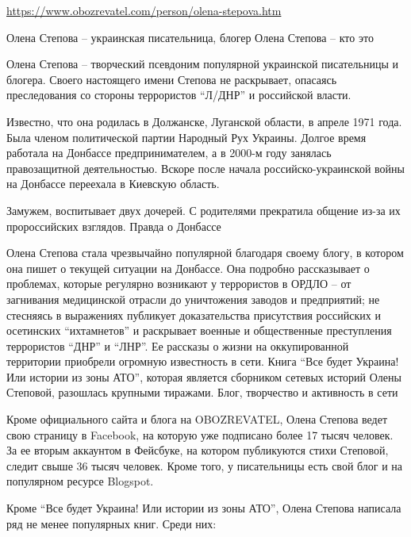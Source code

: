  
 
 
 
 

\url{https://www.obozrevatel.com/person/olena-stepova.htm}

Олена Степова – украинская писательница, блогер
Олена Степова – кто это

Олена Степова – творческий псевдоним популярной украинской писательницы и блогера. Своего настоящего имени Степова не раскрывает, опасаясь преследования со стороны террористов “Л/ДНР” и российской власти.

Известно, что она родилась в Должанске, Луганской области, в апреле 1971 года. Была членом политической партии Народный Рух Украины. Долгое время работала на Донбассе предпринимателем, а в 2000-м году занялась правозащитной деятельностью. Вскоре после начала российско-украинской войны на Донбассе переехала в Киевскую область.

Замужем, воспитывает двух дочерей. С родителями прекратила общение из-за их пророссийских взглядов.
Правда о Донбассе

Олена Степова стала чрезвычайно популярной благодаря своему блогу, в котором она пишет о текущей ситуации на Донбассе. Она подробно рассказывает о проблемах, которые регулярно возникают у террористов в ОРДЛО – от загнивания медицинской отрасли до уничтожения заводов и предприятий; не стесняясь в выражениях публикует доказательства присутствия российских и осетинских “ихтамнетов” и раскрывает военные и общественные преступления террористов “ДНР” и “ЛНР”. Ее рассказы о жизни на оккупированной территории приобрели огромную известность в сети. Книга “Все будет Украина! Или истории из зоны АТО”, которая является сборником сетевых историй Олены Степовой, разошлась крупными тиражами.
Блог, творчество и активность в сети

Кроме официального сайта и блога на OBOZREVATEL, Олена Степова ведет свою страницу в Facebook, на которую уже подписано более 17 тысяч человек. За ее вторым аккаунтом в Фейсбуке, на котором публикуются стихи Степовой, следит свыше 36 тысяч человек. Кроме того, у писательницы есть свой блог и на популярном ресурсе Blogspot.

Кроме “Все будет Украина! Или истории из зоны АТО”, Олена Степова написала ряд не менее популярных книг. Среди них:

